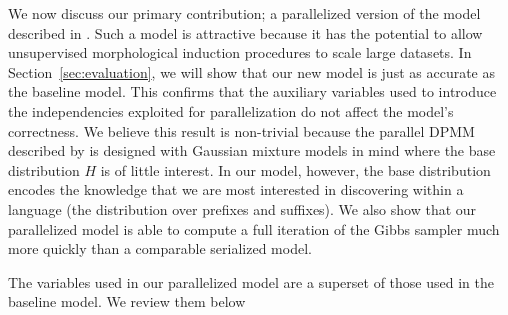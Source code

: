 We now discuss our primary contribution; a parallelized version of the
model described in \cite{goldwater2011}. Such a model is attractive
because it has the potential to allow unsupervised morphological
induction procedures to scale large datasets. In Section~\ref{sec:evaluation},
we will show that our new model is just as
accurate as the baseline model. This confirms that the auxiliary
variables used to introduce the independencies exploited for
parallelization do not affect the model's correctness. We believe this
result is non-trivial because the parallel DPMM described by
\cite{williamson2013} is designed with Gaussian mixture models in mind
where the base distribution $H$ is of little interest. In our model,
however, the base distribution encodes the knowledge that we are most
interested in discovering within a language (the distribution over
prefixes and suffixes). We also show that our parallelized model is
able to compute a full iteration of the Gibbs sampler much more
quickly than a comparable serialized model.

The variables used in our parallelized model are a superset of those
used in the baseline model. We review them below


